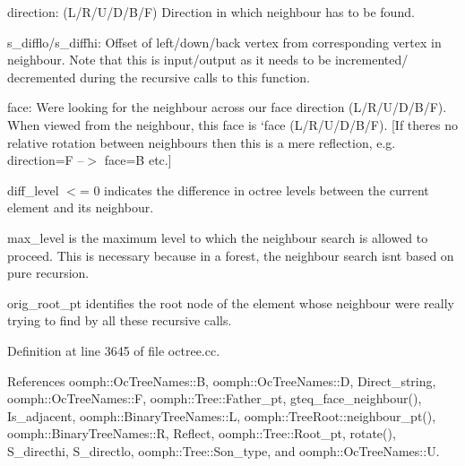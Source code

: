 \begin{DoxyItemize}
\item direction\+: (L/\+R/\+U/\+D/\+B/F) Direction in which neighbour has to be found.
\item s\+\_\+difflo/s\+\_\+diffhi\+: Offset of left/down/back vertex from corresponding vertex in neighbour. Note that this is input/output as it needs to be incremented/ decremented during the recursive calls to this function.
\item face\+: We\textquotesingle{}re looking for the neighbour across our face \textquotesingle{}direction\textquotesingle{} (L/\+R/\+U/\+D/\+B/F). When viewed from the neighbour, this face is `face\textquotesingle{} (L/\+R/\+U/\+D/\+B/F). \mbox{[}If there\textquotesingle{}s no relative rotation between neighbours then this is a mere reflection, e.\+g. direction=F --$>$ face=B etc.\mbox{]}
\item diff\+\_\+level $<$= 0 indicates the difference in octree levels between the current element and its neighbour.
\item max\+\_\+level is the maximum level to which the neighbour search is allowed to proceed. This is necessary because in a forest, the neighbour search isn\textquotesingle{}t based on pure recursion.
\item orig\+\_\+root\+\_\+pt identifies the root node of the element whose neighbour we\textquotesingle{}re really trying to find by all these recursive calls. 
\end{DoxyItemize}

Definition at line 3645 of file octree.\+cc.



References oomph\+::\+Oc\+Tree\+Names\+::B, oomph\+::\+Oc\+Tree\+Names\+::D, Direct\+\_\+string, oomph\+::\+Oc\+Tree\+Names\+::F, oomph\+::\+Tree\+::\+Father\+\_\+pt, gteq\+\_\+face\+\_\+neighbour(), Is\+\_\+adjacent, oomph\+::\+Binary\+Tree\+Names\+::L, oomph\+::\+Tree\+Root\+::neighbour\+\_\+pt(), oomph\+::\+Binary\+Tree\+Names\+::R, Reflect, oomph\+::\+Tree\+::\+Root\+\_\+pt, rotate(), S\+\_\+directhi, S\+\_\+directlo, oomph\+::\+Tree\+::\+Son\+\_\+type, and oomph\+::\+Oc\+Tree\+Names\+::U.

\mbox{\label{classoomph_1_1OcTree_ab5a26409cd49a430095915c76060f476}} 
